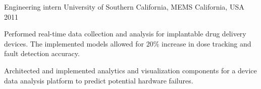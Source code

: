 \begin{cventries}





\cventry
{Engineering intern}
{University of Southern California, MEMS}
{California, USA}
{2011}
{
\begin{cvitems}
\item {Performed real-time data collection and analysis for implantable drug delivery devices. The implemented models allowed for 20\% increase in dose tracking and fault detection accuracy.}
\item {Architected and implemented analytics and visualization components for a device data analysis platform to predict potential hardware failures.}
\end{cvitems}
}


\end{cventries}